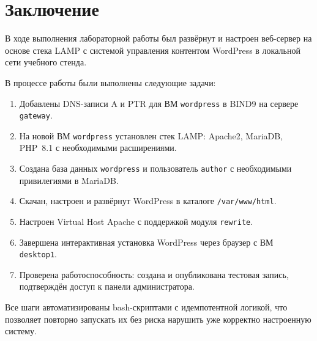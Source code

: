 \chapter*{Заключение}
\label{ch:conclusion}

В ходе выполнения лабораторной работы был развёрнут и настроен
веб-сервер на основе стека LAMP с системой управления контентом
WordPress в локальной сети учебного стенда.

В процессе работы были выполнены следующие задачи:
\begin{enumerate}
  \item Добавлены DNS-записи A и PTR для ВМ \texttt{wordpress}
        в BIND9 на сервере \texttt{gateway}.
  \item На новой ВМ \texttt{wordpress} установлен стек LAMP:
        Apache2, MariaDB, PHP~8.1 с необходимыми расширениями.
  \item Создана база данных \texttt{wordpress} и пользователь
        \texttt{author} с необходимыми привилегиями в MariaDB.
  \item Скачан, настроен и развёрнут WordPress в каталоге
        \texttt{/var/www/html}.
  \item Настроен Virtual Host Apache с поддержкой модуля
        \texttt{rewrite}.
  \item Завершена интерактивная установка WordPress через браузер
        с ВМ \texttt{desktop1}.
  \item Проверена работоспособность: создана и опубликована
        тестовая запись, подтверждён доступ к панели администратора.
\end{enumerate}

Все шаги автоматизированы bash-скриптами с идемпотентной логикой,
что позволяет повторно запускать их без риска нарушить уже
корректно настроенную систему.

\endinput
